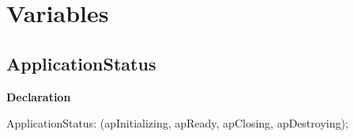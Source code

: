 \documentclass{report}
\newif\ifpdf
\begin{document}
\section{Variables}
\ifpdf
\subsection*{\large{\textbf{ApplicationStatus}}\normalsize\hspace{1ex}\hrulefill}
\else
\subsection*{ApplicationStatus}
\fi
\label{ok_enum_field_var-ApplicationStatus}
\begin{list}{}{
\setlength{\itemindent}{0cm}
\setlength{\listparindent}{0cm}
\setlength{\leftmargin}{\evensidemargin}
\addtolength{\leftmargin}{\tmplength}
\settowidth{\labelsep}{X}
\addtolength{\leftmargin}{\labelsep}
\setlength{\labelwidth}{\tmplength}
}
\item[\textbf{Declaration}\hfill]
\ifpdf
\begin{flushleft}
\fi
\begin{ttfamily}
ApplicationStatus: (apInitializing, apReady, apClosing, apDestroying);\end{ttfamily}

\ifpdf
\end{flushleft}
\fi

\end{list}
\end{document}
